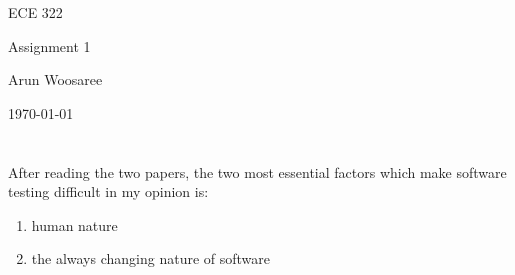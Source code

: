 \documentclass[letterpaper]{article}
\begin{document}
\begin{titlepage}
 \begin{center}
  \vspace*{1cm}
  \Huge
  ECE 322
  \vspace{1cm}
  
  Assignment 1
  \vspace{1cm}
  
  Arun Woosaree
  
  \today
  \vfill
 \end{center}
\end{titlepage}

\section{}
After reading the two papers, the two most essential factors which make software testing difficult in my opinion is: 

\begin{enumerate}
	\item human nature
	\item the always changing nature of software
\end{enumerate}

\section{}
\end{document}
